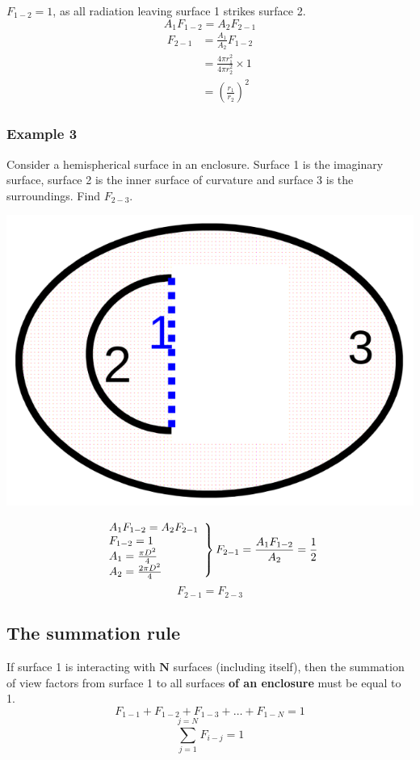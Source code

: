 \documentclass[11pt]{article}
\begin{document}
\(F_{1-2} = 1\), as all radiation leaving surface 1 strikes surface 2.
\[A_1 F_{1-2} = A_2 F_{2-1}\]
\begin{align*}
F_{2-1} &= \frac{A_1}{A_2} F_{1-2} \\
&= \frac{4 \pi r_1^2}{4 \pi r_2^2} \times 1 \\
&= \left(\frac{r_1}{r_2} \right)^2
\end{align*}

 \newpage
\subsubsection{Example 3}
\label{sec:orge050227}
Consider a hemispherical surface in an enclosure. Surface 1 is the imaginary surface, surface 2 is the inner surface of curvature and surface 3 is the surroundings. Find \(F_{2-3}\).
\begin{center}
\includegraphics[width=.9\linewidth]{./images/reciprocity-relation-example-3-diagram.png}
\end{center}

\begin{displaymath}
\left.\begin{array}{lr}
A_1 F_{1-2} = A_2 F_{2-1} \\
F_{1-2} = 1 \\
A_1 = \frac{\pi D^2}{4} \\
A_2 = \frac{2 \pi D^2}{4}
\end{array} \right\} F_{2-1} = \frac{A_1 F_{1-2}}{A_2} = \frac{1}{2} \\
\end{displaymath}
\[F_{2-1} = F_{2-3}\]

 \newpage
\subsection{The summation rule}
\label{sec:org56871fb}
If surface 1 is interacting with \(\boldsymbol{N}\) surfaces (including itself), then the summation of view factors from surface 1 to all surfaces \textbf{of an enclosure} must be equal to 1.
\[F_{1-1} + F_{1-2} + F_{1-3} + \ldots + F_{1-N} = 1\]
\[\sum_{j=1}^{j=N} F_{i-j} = 1\]
\end{document}
